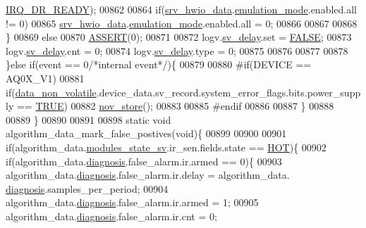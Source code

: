 \begin{DoxyCode}
{{{{{      \hyperlink{a00021_acfd80444497090bce928df199247a0ec}{IRQ\_DR\_READY});
00862 
00864            \textcolor{keywordflow}{if}(\hyperlink{a00034_a0fd91014631926f362c7c2b2f5d143b0}{srv\_hwio\_data}.\hyperlink{a00034_a742dceaef1f19ec73ed5acc066127476}{emulation\_mode}.enabled.all != 0)
00865                \hyperlink{a00034_a0fd91014631926f362c7c2b2f5d143b0}{srv\_hwio\_data}.\hyperlink{a00034_a742dceaef1f19ec73ed5acc066127476}{emulation\_mode}.enabled.all = 0;
00866 
00867 
00868        \}
00869        \textcolor{keywordflow}{else}
00870           \hyperlink{a00072_abb8ff8e213ac9f6fb21d2b968583b936}{ASSERT}(0);
00871 
00872             logv.\hyperlink{a00021_a854b8f967c206a5f3e4aeaf91a782b3e}{sv\_delay}.set  = \hyperlink{a00040_aa93f0eb578d23995850d61f7d61c55c1}{FALSE};
00873             logv.\hyperlink{a00021_a854b8f967c206a5f3e4aeaf91a782b3e}{sv\_delay}.cnt  = 0;
00874             logv.\hyperlink{a00021_a854b8f967c206a5f3e4aeaf91a782b3e}{sv\_delay}.type = 0;
00875 
00876        
00877 
00878     \}\textcolor{keywordflow}{else} \textcolor{keywordflow}{if}(event == 0\textcolor{comment}{/*internal event*/})\{
00879 
00880 \textcolor{preprocessor}{#if(DEVICE == AQ0X\_V1)}
00881     \textcolor{keywordflow}{if}(\hyperlink{a00060_a76ac5f917f5308dcd83de0d7c94559fb}{data\_non\_volatile}.device\_data.sv\_record.system\_error\_flags.bits.power\_supply == 
      \hyperlink{a00040_aa8cecfc5c5c054d2875c03e77b7be15d}{TRUE})
00882        \hyperlink{a00029_a90aef186f45a15d94bf0247122194991}{nov\_store}();
00883 
00885 \textcolor{preprocessor}{#endif}
00886       
00887     \}
00888 
00889 \}
00890 
00891 
00898  \textcolor{keyword}{static} \textcolor{keywordtype}{void} algorithm\_data\_mark\_false\_postives(\textcolor{keywordtype}{void})\{
00899 
00900    
00901         \textcolor{keywordflow}{if}(algorithm\_data.\hyperlink{a00016_a293140e240bbd54f7601adbc9194148c}{modules\_state\_sv}.ir\_sen.fields.state == 
      \hyperlink{a00021_a1eb14cc432874ddacd1934791dbe12a3}{HOT})\{
00902             \textcolor{keywordflow}{if}(algorithm\_data.\hyperlink{a00016_a16f85d57ec98b4ad05f5a2e10536b3c6}{diagnosis}.false\_alarm.ir.armed == 0)\{
00903               algorithm\_data.\hyperlink{a00016_a16f85d57ec98b4ad05f5a2e10536b3c6}{diagnosis}.false\_alarm.ir.delay = algorithm\_data.
      \hyperlink{a00016_a16f85d57ec98b4ad05f5a2e10536b3c6}{diagnosis}.samples\_per\_period;
00904               algorithm\_data.\hyperlink{a00016_a16f85d57ec98b4ad05f5a2e10536b3c6}{diagnosis}.false\_alarm.ir.armed = 1;
00905               algorithm\_data.\hyperlink{a00016_a16f85d57ec98b4ad05f5a2e10536b3c6}{diagnosis}.false\_alarm.ir.cnt = 0;
}}}}}
\end{DoxyCode}
